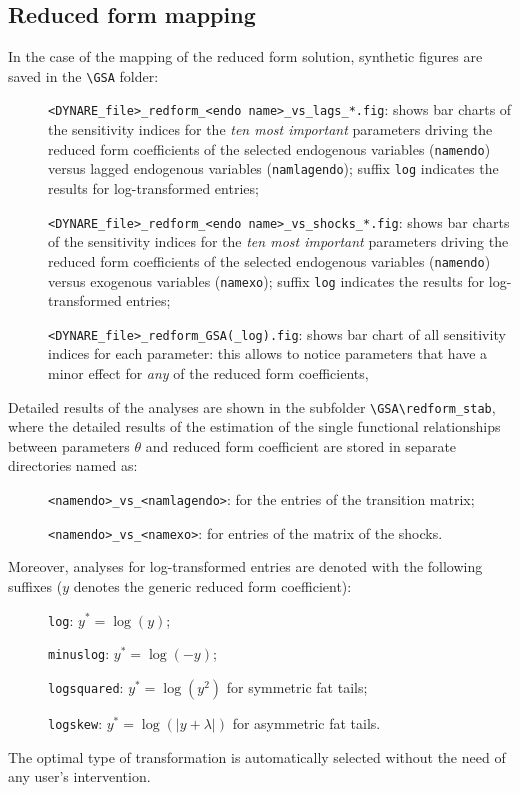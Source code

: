 \documentclass[12pt,a4paper]{article}
\begin{document}
\subsection{Reduced form mapping}
In the case of the mapping of the reduced form solution, synthetic
figures are saved in the \verb"\GSA" folder:

\begin{description}
\item[]\verb"<DYNARE_file>_redform_<endo name>_vs_lags_*.fig":
shows bar charts of the sensitivity indices for the \emph{ten most
important} parameters driving the reduced form coefficients of the
selected endogenous variables (\verb"namendo") versus lagged
endogenous variables (\verb"namlagendo"); suffix \verb"log"
indicates the results for  log-transformed entries;
\item[]\verb"<DYNARE_file>_redform_<endo name>_vs_shocks_*.fig":
shows bar charts of the sensitivity indices for the \emph{ten most
important} parameters driving the reduced form coefficients of the
selected endogenous variables (\verb"namendo") versus exogenous
variables (\verb"namexo"); suffix \verb"log" indicates the results
for  log-transformed entries;
\item[]\verb"<DYNARE_file>_redform_GSA(_log).fig": shows bar chart of
all sensitivity indices for each  parameter: this allows to notice
parameters that have a minor effect for \emph{any} of the reduced
form coefficients,
\end{description}

Detailed results of the analyses are shown in the subfolder
\verb"\GSA\redform_stab", where the detailed results of the
estimation of the single functional relationships between
parameters $\theta$ and reduced form coefficient are stored in
separate directories named as:
\begin{description}
\item[]\verb"<namendo>_vs_<namlagendo>": for the entries of the
transition matrix;
\item[]\verb"<namendo>_vs_<namexo>": for entries of the matrix of
the shocks.
\end{description}
Moreover, analyses for log-transformed entries are denoted with
the following suffixes ($y$ denotes the generic reduced form
coefficient):
\begin{description}
\item[]\verb"log": $y^*=\log(y)$;
\item[]\verb"minuslog": $y^*=\log(-y)$;
\item[]\verb"logsquared": $y^*=\log(y^2)$ for symmetric fat tails;
\item[]\verb"logskew": $y^*=\log(|y+\lambda|)$ for asymmetric fat tails.
\end{description}
The optimal type of transformation is automatically selected
without the need of any user's intervention.
\end{document}
